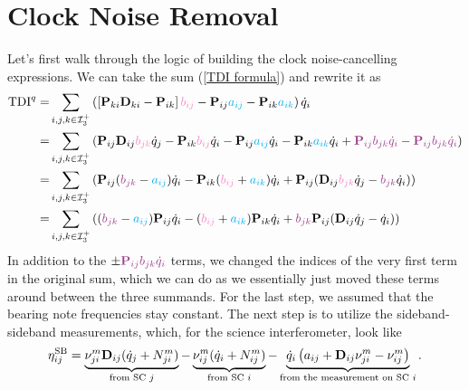 \documentclass[11pt]{article}
\begin{document}
\section{Clock Noise Removal}
Let's first walk through the logic of building the clock noise-cancelling expressions. We can take the sum (\ref{TDI formula}) and rewrite it as
\begin{align}
    \nonumber\text{TDI}^q =& 
    \sum_{i,j,k\in\mathcal{I}^+_3}
    \left(
        \left[\mathbf{P}_{ki}\mathbf{D}_{ki}-\mathbf{P}_{ik}\right]\color{Lavender}b_{ij}\color{black}
        -\mathbf{P}_{ij}\color{cyan}a_{ij}\color{black}
        -\mathbf{P}_{ik}\color{cyan}a_{ik}\color{black}
    \right)\dot{q}_i\\
    \nonumber=&\sum_{i,j,k\in\mathcal{I}^+_3}
    \left(
        \mathbf{P}_{ij}\mathbf{D}_{ij}\color{Lavender}b_{jk}\color{black}\dot{q}_j-\mathbf{P}_{ik}\color{Lavender}b_{ij}\color{black}\dot{q}_i
        -\mathbf{P}_{ij}\color{cyan}a_{ij}\color{black}\dot{q}_i
        -\mathbf{P}_{ik}\color{cyan}a_{ik}\color{black}\dot{q}_i + \color{DarkOrchid}\mathbf{P}_{ij}b_{jk}\dot{q}_i\color{black}-\color{DarkOrchid}\mathbf{P}_{ij}b_{jk}\dot{q}_i\color{black}
    \right) \\
    \nonumber=&\sum_{i,j,k\in\mathcal{I}^+_3}
    \left(
        \mathbf{P}_{ij}(\color{DarkOrchid}b_{jk}\color{black}-\color{cyan}a_{ij}\color{black})\dot{q}_i -\mathbf{P}_{ik}(\color{Lavender}b_{ij}\color{black}+\color{cyan}a_{ik}\color{black})\dot{q}_i  +\mathbf{P}_{ij}(\mathbf{D}_{ij}\color{Lavender}b_{jk}\color{black}\dot{q}_j-\color{DarkOrchid}b_{jk}\color{black}\dot{q}_i)
    \right) \\
    =&\sum_{i,j,k\in\mathcal{I}^+_3}
    \left(
        (\color{DarkOrchid}b_{jk}\color{black}-\color{cyan}a_{ij}\color{black})\mathbf{P}_{ij}\dot{q}_i -(\color{Lavender}b_{ij}\color{black}+\color{cyan}a_{ik}\color{black})\mathbf{P}_{ik}\dot{q}_i  +\color{DarkOrchid}b_{jk}\color{black}\mathbf{P}_{ij}(\mathbf{D}_{ij}\dot{q}_j-\dot{q}_i)
    \right)\label{new}
\end{align}
In addition to the $\pm \color{DarkOrchid}\mathbf{P}_{ij}b_{jk}\dot{q}_i\color{black}$ terms, we changed the indices of the very first term in the original sum, which we can do as we essentially just moved these terms around between the three summands. For the last step, we assumed that the bearing note frequencies stay constant. The next step is to utilize the sideband-sideband measurements, which, for the science interferometer, look like
\begin{equation*}
\eta^{\text{SB}}_{ij} =
\underbrace{%
    \nu_{j i}^{m} \mathbf{D}_{ij} (\dot{q}_j + N_{j i}^{m})
}_{\text{from SC $j$}}
-
\underbrace{%
    \nu_{i j}^{m} (\dot{q}_i + N_{i j}^{m})
}_{\text{from SC $i$}}
-
\underbrace{%
    \dot{q}_i \left( a_{ij} + \mathbf{D}_{ij} \nu_{j i}^{m} - \nu_{i j}^{m} \right)
}_{\text{from the measurement on SC $i$}}.
\end{equation*}
\end{document}
